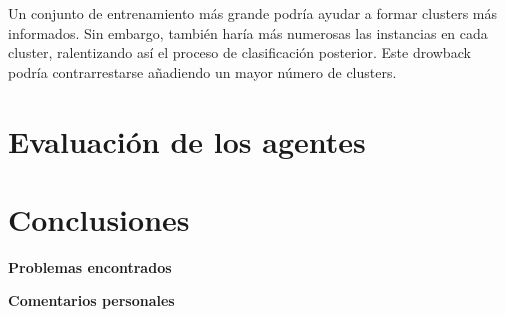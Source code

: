 \documentclass[12pt]{article}
\begin{document}
Un conjunto de entrenamiento más grande podría ayudar a formar clusters más informados. Sin embargo, también haría más numerosas las instancias en cada cluster, ralentizando así el proceso de clasificación posterior. Este drowback podría contrarrestarse añadiendo un mayor número de clusters.

\section{Evaluación de los agentes}





\newpage
\section{Conclusiones}


\vspace{0.2cm}

\centerline{\textbf{Problemas encontrados}}

\vspace{0.5cm}


\vspace{0.5cm}

\centerline{\textbf{Comentarios personales}}

\vspace{0.5cm}

\end{document}
